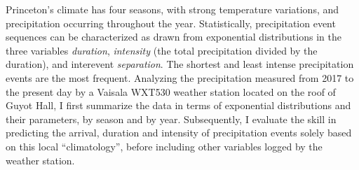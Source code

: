 

Princeton's climate has four seasons, with strong temperature
variations, and precipitation occurring throughout the
year. Statistically, precipitation event sequences can be
characterized as drawn from exponential distributions in the three
variables \textit{duration}, \textit{intensity} (the total
precipitation divided by the duration), and interevent
\textit{separation}. The shortest and least intense precipitation
events are the most frequent. Analyzing the precipitation measured
from 2017 to the present day by a Vaisala WXT530 weather station
located on the roof of Guyot Hall, I first summarize the data in terms
of exponential distributions and their parameters, by season and by
year. Subsequently, I evaluate the skill in predicting the arrival,
duration and intensity of precipitation events solely based on this
local ``climatology'', before including other variables logged by the
weather station.
